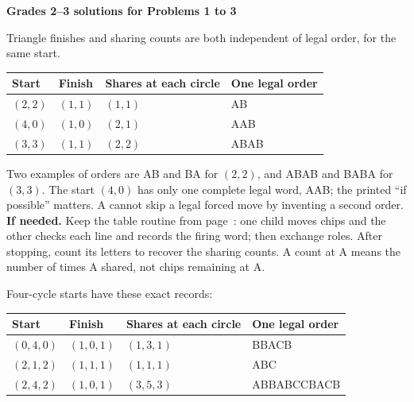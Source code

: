 \documentclass[11pt,letterpaper]{article}
\newcommand{\pagehead}[1]{{\Large\bfseries #1}\par\vspace{3pt}}
\newcommand{\prob}[2]{\par\vspace{5pt}{\large\bfseries #1}\par #2}
\newcommand{\hint}[1]{\textbf{If needed.} #1\par}
\begin{document}
\newpage
\pagehead{Grades 2--3 solutions for Problems 1 to 3}
\prob{Problem 1}{Triangle finishes and sharing counts are both independent of legal order, for the same start.}
\begin{center}\begin{tabular}{llll}\toprule Start & Finish & Shares at each circle & One legal order\\\midrule
$(2,2)$ & $(1,1)$ & $(1,1)$ & AB\\
$(4,0)$ & $(1,0)$ & $(2,1)$ & AAB\\
$(3,3)$ & $(1,1)$ & $(2,2)$ & ABAB\\
\bottomrule\end{tabular}\end{center}

Two examples of orders are AB and BA for $(2,2)$, and ABAB and BABA for $(3,3)$. The start $(4,0)$ has only one complete legal word, AAB; the printed ``if possible'' matters. A cannot skip a legal forced move by inventing a second order.
\hint{Keep the table routine from page~\pageref{preparation}: one child moves chips and the other checks each line and records the firing word; then exchange roles. After stopping, count its letters to recover the sharing counts. A count at A means the number of times A shared, not chips remaining at A.}
\prob{Problem 2}{Four-cycle starts have these exact records:}
\begin{center}\begin{tabular}{llll}\toprule Start & Finish & Shares at each circle & One legal order\\\midrule
$(0,4,0)$ & $(1,0,1)$ & $(1,3,1)$ & BBACB\\
$(2,1,2)$ & $(1,1,1)$ & $(1,1,1)$ & ABC\\
$(2,4,2)$ & $(1,0,1)$ & $(3,5,3)$ & ABBABCCBACB\\
\bottomrule\end{tabular}\end{center}
\end{document}

